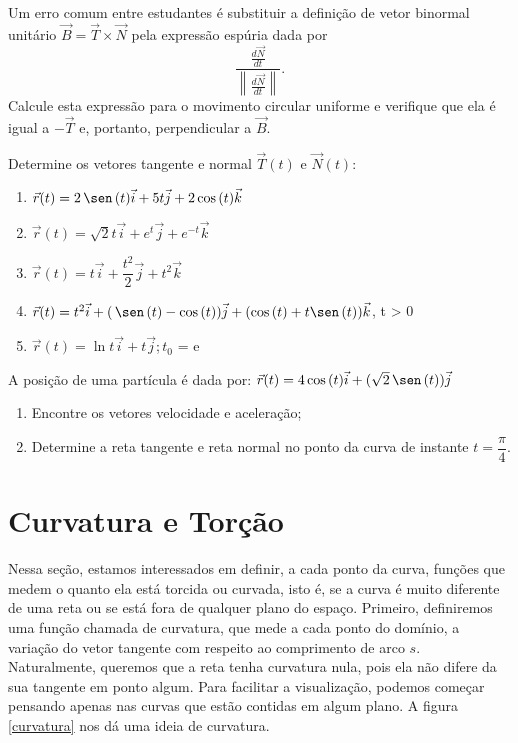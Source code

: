 \begin{exer} Um erro comum entre estudantes é substituir a definição de vetor binormal unitário $\vec{B}=\vec{T}\times\vec{N}$ pela expressão espúria dada por $$\frac{\frac{d\vec{N}}{dt}}{\left\|\frac{d\vec{N}}{dt}\right\|}.$$ Calcule esta expressão para o movimento circular uniforme e verifique que ela é igual a $-\vec{T}$ e, portanto, perpendicular a $\vec{B}$.
\end{exer}
\begin{exer} Determine os vetores tangente e normal $  \vec T(t)  $ e $ \vec N(t) $:
\begin{enumerate}
    \item $\vec r(t)=2\,\sen\,(t)\vec i+5t\vec j+2\cos\,(t)\vec k$
    \item $\vec r(t)=\sqrt{2}t\vec i+e^t\vec j+e^{-t}\vec k$
    \item $\vec r(t)=t\vec i+\dfrac{t^2}{2}\vec j+t^2\vec k$
    \item $\vec r(t)=t^2\vec i+(\,\sen\,(t)-\cos\,(t)) \vec j+(\cos\,(t)+t\sen\,(t))\vec k$, t > 0
    \item $\vec r(t)=\ln{t}\vec i+t\vec j$;\,$t_0$ = e
\end{enumerate}
\end{exer}
\begin{exer} A posição de uma partícula é dada por: $\vec r(t)=4\cos\,(t)\vec i+(\sqrt{2}\,\sen\,(t))\vec j$
\begin{enumerate}
    \item Encontre os vetores velocidade e aceleração;
    \item Determine a reta tangente e reta normal no ponto da curva de instante $t=\dfrac{\pi}{4}$.
\end{enumerate}
\end{exer}
\construirExer


\section{Curvatura e Torção}

Nessa seção, estamos interessados em definir, a cada ponto da curva, funções que medem o quanto ela está torcida ou curvada, isto é, se a curva é muito diferente de uma reta ou se está fora de qualquer plano do espaço. Primeiro, definiremos uma função chamada de curvatura, que mede a cada ponto do domínio, a variação do vetor tangente com respeito ao comprimento de arco $s$. Naturalmente, queremos que a reta tenha curvatura nula, pois ela não difere da sua tangente em ponto algum. Para facilitar a visualização, podemos começar pensando apenas nas curvas que estão contidas em algum plano. A figura \ref{curvatura} nos dá uma ideia de curvatura.


